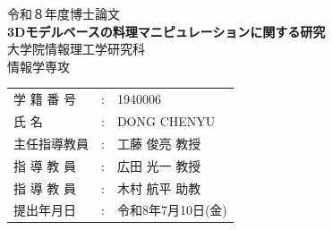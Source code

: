 
\usepackage{subcaption}



	\begin{titlepage}
		\begin{center}
			{\large 令和８年度博士論文} \\
			\vspace{2cm}
			{\LARGE \bf 3Dモデルベースの料理マニピュレーションに関する研究} \\
			
			\vspace{2cm}
			{\large 大学院情報理工学研究科 } \\
			{\large 情報学専攻} \\
			\vspace{3cm}
			\begin{tabular}{lcl}
				{\large 学 籍 番 号} &{\large :}	& {\large 1940006} \\ 
				{\large 氏 \hspace{11mm} 名}	&{\large :}& {\large DONG CHENYU} \\ 
				{\large 主任指導教員}			&{\large :}& {\large 工藤 俊亮 教授} \\ 
				{\large 指 導 教 員}			&{\large :}& {\large 広田 光一 教授} \\ 
				{\large 指 導 教 員}			&{\large :}& {\large 木村 航平 助教} \\ 
				{\large 提出年月日}			&{\large :}& {\large 令和8年7月10日(金)}
			\end{tabular}
		\end{center}
	\end{titlepage}
	
	\normalsize
	
	
	\tableofcontents
	\listoffigures
	\listoftables
	
	
	
	
	
	
	
	
	

    
	
    
    

